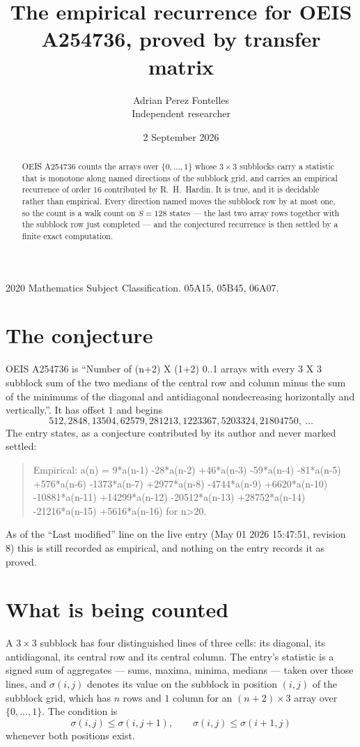 \documentclass[11pt,a4paper]{article}
\title{The empirical recurrence for OEIS A254736, proved by transfer matrix}
\author{Adrian Perez Fontelles\\ \small Independent researcher}
\date{2 September 2026}
\theoremstyle{plain}
\theoremstyle{definition}
\begin{document}
\maketitle

\begin{abstract}
OEIS A254736 counts the arrays over $\{0,\dots,1\}$ whose $3\times3$ subblocks carry a
statistic that is monotone along named directions of the subblock grid, and carries an
empirical recurrence of order $16$ contributed by R.~H.~Hardin. It is true, and it is
decidable rather than empirical. Every direction named moves the subblock row by at most one,
so the count is a walk count on $S=128$ states --- the last two array rows together with the
subblock row just completed --- and the conjectured recurrence is then settled by a finite
exact computation.
\end{abstract}

\noindent\small 2020 Mathematics Subject Classification. 05A15, 05B45, 06A07.\normalsize

\section{The conjecture}

OEIS A254736 is ``Number of (n+2) X (1+2) 0..1 arrays with every 3 X 3 subblock sum of the two medians of the central row and column minus the sum of the minimums of the diagonal and antidiagonal nondecreasing horizontally and vertically.''. It has offset $1$ and begins
\[
512, 2848, 13504, 62579, 281213, 1223367, 5203324, 21804750,\ \dots
\]
The entry states, as a conjecture contributed by its author and never marked settled:
\begin{quote}
Empirical: a(n) = 9*a(n-1) -28*a(n-2) +46*a(n-3) -59*a(n-4) -81*a(n-5) +576*a(n-6) -1373*a(n-7) +2977*a(n-8) -4744*a(n-9) +6620*a(n-10) -10881*a(n-11) +14299*a(n-12) -20512*a(n-13) +28752*a(n-14) -21216*a(n-15) +5616*a(n-16) for n>20.
\end{quote}
As of the ``Last modified'' line on the live entry (May 01 2026 15:47:51, revision 8) this is still
recorded as empirical, and nothing on the entry records it as proved.

\section{What is being counted}

A $3\times3$ subblock has four distinguished lines of three cells: its diagonal, its
antidiagonal, its central row and its central column. The entry's statistic is a signed sum of
aggregates --- sums, maxima, minima, medians --- taken over those lines, and $\sigma(i,j)$
denotes its value on the subblock in position $(i,j)$ of the subblock grid, which has $n$ rows
and $1$ column for an $(n+2)\times3$ array over $\{0,\dots,1\}$. The condition is
\[
\sigma(i,j)\le\sigma(i,j+1),\qquad \sigma(i,j)\le\sigma(i+1,j)
\]
whenever both positions exist.
\end{document}
